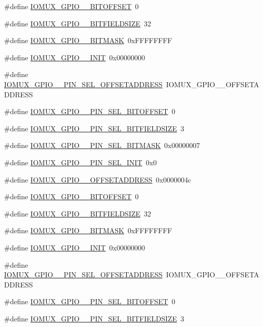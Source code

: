 \begin{DoxyCompactItemize}
\#define \hyperlink{a00560_a998462e6cf63143cbc32da55d8940447}{IOMUX\_\-GPIO\_\_\-BITOFFSET}~0
\item 
\#define \hyperlink{a00560_a643b8456a2fabb11fd9b2be2ce2ba5f8}{IOMUX\_\-GPIO\_\_\-BITFIELDSIZE}~32
\item 
\#define \hyperlink{a00560_a68b5a7d3969a2b0aefe23f13899e3bbb}{IOMUX\_\-GPIO\_\_\-BITMASK}~0xFFFFFFFF
\item 
\#define \hyperlink{a00560_a6cdb75a6b418562b33f6ccd1df8c42cc}{IOMUX\_\-GPIO\_\_\-INIT}~0x00000000
\item 
\#define \hyperlink{a00560_a2c660eabf32dcb673c81df5c3faeb6bd}{IOMUX\_\-GPIO\_\_\-PIN\_\-SEL\_\-OFFSETADDRESS}~IOMUX\_\-GPIO\_\_\-OFFSETADDRESS
\item 
\#define \hyperlink{a00560_a89673a551ff8c88ed3ed577d3ef13789}{IOMUX\_\-GPIO\_\_\-PIN\_\-SEL\_\-BITOFFSET}~0
\item 
\#define \hyperlink{a00560_aae056d8369902de0411a5c830bb75394}{IOMUX\_\-GPIO\_\_\-PIN\_\-SEL\_\-BITFIELDSIZE}~3
\item 
\#define \hyperlink{a00560_aed90cd8418c53257c9992549c9f85b4b}{IOMUX\_\-GPIO\_\_\-PIN\_\-SEL\_\-BITMASK}~0x00000007
\item 
\#define \hyperlink{a00560_aedf19d3bdd51cdfd6b97a8379272f6cc}{IOMUX\_\-GPIO\_\_\-PIN\_\-SEL\_\-INIT}~0x0
\item 
\#define \hyperlink{a00560_ac13fdaf04803a5a62a168ca1790541c2}{IOMUX\_\-GPIO\_\_\-OFFSETADDRESS}~0x0000004c
\item 
\#define \hyperlink{a00560_a53f3698b95986b96d92774477dfde58b}{IOMUX\_\-GPIO\_\_\-BITOFFSET}~0
\item 
\#define \hyperlink{a00560_a1218d5c966294a172894f548ec96ed24}{IOMUX\_\-GPIO\_\_\-BITFIELDSIZE}~32
\item 
\#define \hyperlink{a00560_af629906bdbc8c3b8a41f50554c312c62}{IOMUX\_\-GPIO\_\_\-BITMASK}~0xFFFFFFFF
\item 
\#define \hyperlink{a00560_a17dbb4500ea76560a6d0e6fdacaf8fd3}{IOMUX\_\-GPIO\_\_\-INIT}~0x00000000
\item 
\#define \hyperlink{a00560_a3de7c6d8b6715ed37d6e360c682f84cc}{IOMUX\_\-GPIO\_\_\-PIN\_\-SEL\_\-OFFSETADDRESS}~IOMUX\_\-GPIO\_\_\-OFFSETADDRESS
\item 
\#define \hyperlink{a00560_a299b15993c85fba154c7ee9906f4e889}{IOMUX\_\-GPIO\_\_\-PIN\_\-SEL\_\-BITOFFSET}~0
\item 
\#define \hyperlink{a00560_a59e82a046be159b8e8f99ae8bab74902}{IOMUX\_\-GPIO\_\_\-PIN\_\-SEL\_\-BITFIELDSIZE}~3

\end{DoxyCompactItemize}
